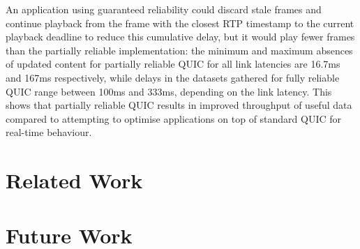 \documentclass{mpaper}
\begin{document}
An application using guaranteed reliability could discard stale frames and continue playback from the frame with the closest RTP timestamp to the current playback deadline to reduce this cumulative delay, but it would play fewer frames than the partially reliable implementation: the minimum and maximum absences of updated content for partially reliable QUIC for all link latencies are 16.7ms  and 167ms respectively, while delays in the datasets gathered for fully reliable QUIC range between 100ms and 333ms, depending on the link latency. This shows that partially reliable QUIC results in improved throughput of useful data compared to attempting to optimise applications on top of standard QUIC for real-time behaviour.

\clearpage
\section{Related Work}

%
% 



\section{Future Work}
\end{document}
